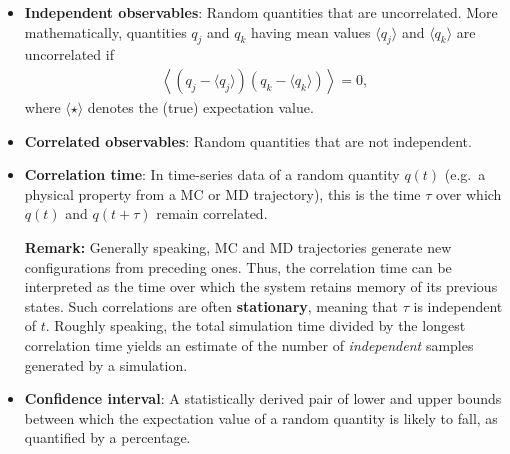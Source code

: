 \begin{itemize}
\item {\bf Independent observables}:  Random quantities that are uncorrelated.  More mathematically, quantities $q_j$ and $q_k$ having mean values $\langle q_j \rangle $ and $\langle q_k \rangle$ are uncorrelated if
\begin{align}
\left \langle \left(q_j - \langle q_j \rangle  \right) \left( q_k - \langle q_k \rangle  \right) \right \rangle = 0,
\end{align}
where $\langle \star \rangle$ denotes the (true) expectation value.

\item {\bf Correlated observables}: Random quantities that are not independent.

\item {\bf Correlation time}: In time-series data of a random quantity $q(t)$ (e.g.\ a physical property from a MC or MD trajectory), this is the time $\tau$ over which $q(t)$ and $q(t+\tau)$ remain correlated.  

\medskip

{\bf Remark:} Generally speaking, MC and MD trajectories generate new configurations from preceding ones.  Thus, the correlation time can be interpreted as the time over which the system retains memory of its previous states.  Such correlations are often {\bf stationary}, meaning that $\tau$ is independent of $t$.  Roughly speaking, the total simulation time divided by the longest correlation time yields an estimate of the number of {\it independent} samples generated by a simulation.



\item {\bf Confidence interval}: A statistically derived pair of lower and upper bounds between which the expectation value of a random quantity is likely to fall, as quantified by a percentage.





\end{itemize}
